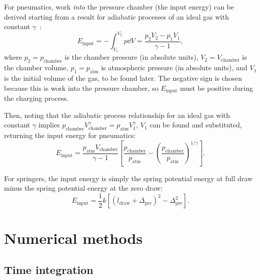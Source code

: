 For pneumatics, work \textit{into} the pressure chamber (the input energy) can be derived starting from a result for adiabatic processes of an ideal gas with constant $\gamma$~\citep[eq.~3.54, p.~129]{moran_fundamentals_2008}:
\begin{equation}
    E_\text{input} = -\int_{V_1}^{V_2} p \dd{V} = \frac{p_2 V_2 - p_1 V_1}{\gamma - 1},
\end{equation}
where
$p_2 = p_\text{chamber}$ is the chamber pressure (in absolute units),
$V_2 = V_\text{chamber}$ is the chamber volume,
$p_1 = p_\text{atm}$ is atmospheric pressure (in absolute units), and
$V_1$ is the initial volume of the gas, to be found later.
The negative sign is chosen because this is work into the pressure chamber, so $E_\text{input}$ must be positive during the charging process.

Then, noting that the adiabatic process relationship for an ideal gas with constant $\gamma$ implies $p_\text{chamber} V_\text{chamber}^\gamma = p_\text{atm} V_1^\gamma$, $V_1$ can be found and substituted, returning the input energy for pneumatics:
\begin{equation}
    E_\text{input} = \frac{p_\text{atm} V_\text{chamber}}{\gamma - 1} \left[\frac{p_\text{chamber}}{p_\text{atm}} - {\left(\frac{p_\text{chamber}}{p_\text{atm}}\right)}^{1/\gamma}\right].
\end{equation}

For springers, the input energy is simply the spring potential energy at full draw minus the spring potential energy at the zero draw:
\begin{equation}
    E_\text{input} = \frac{1}{2} k \left[{\left(l_\text{draw} + \Delta_\text{pre}\right)}^2 - \Delta_\text{pre}^2\right].
\end{equation}


\section{Numerical methods}\label{numerical-methods}

\subsection{Time integration}\label{time-integration}

